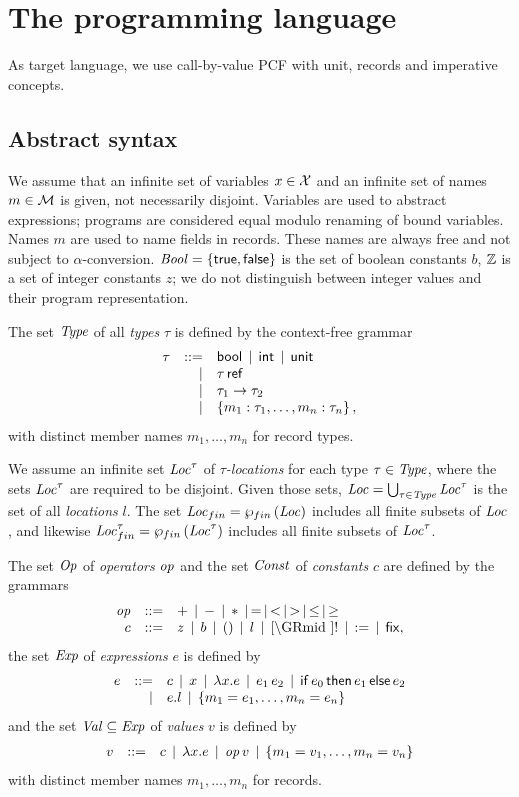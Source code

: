 \documentclass[12pt,a4paper]{report}
\begin{document}

\chapter{The programming language}

As target language, we use call-by-value PCF with unit, records and imperative concepts.



\section{Abstract syntax}

We assume that an infinite set of variables $x \in \mathcal{X}$ and an infinite
set of names $m\in \mathcal{M}$ is given, not necessarily disjoint.
Variables are used to abstract expressions; programs are considered equal modulo
renaming of bound variables. Names $m$ are used to name fields in records. These
names are always free and not subject to $\alpha$-conversion.
$\mathit{Bool} = \{\mathsf{true},\mathsf{false}\}$ is the set of boolean constants $b$,
$\mathbb Z$ is a set of integer constants $z$; we do not distinguish
between integer values and their program representation.

\begin{definition}[Types]
  The set $\mathit{Type}$ of all {\em types} $\tau$ is defined by the context-free grammar
  \[\begin{array}{rrlll}
  \tau & ::= & \mathsf{bool} \,\mid\, \mathsf{int} \,\mid\, \mathsf{unit}
          \\ & \mid & \tau\,\mathsf{ref}
          \\ & \mid & \tau_1\to\tau_2
          \\ & \mid & \left\{m_1:\tau_1,\ldots,m_n:\tau_n\right\},
  \end{array}\]
  with distinct member names $m_1,\ldots,m_n$ for record types.
\end{definition}

We assume an infinite set $\mathit{Loc}^\tau$ of {\em $\tau$-locations} for each type $\tau \in \mathit{Type}$,
where the sets $\mathit{Loc}^\tau$ are required to be disjoint. Given those sets,
$\mathit{Loc} = \bigcup_{\tau\in\mathit{Type}} \mathit{Loc}^\tau$ is the set of all {\em locations} $l$. The set
$\mathit{Loc}_{fin} = \wp_{fin}\,(\mathit{Loc})$ includes all finite subsets of $\mathit{Loc}$, and likewise $\mathit{Loc}_{fin}^\tau = \wp_{fin}\,(\mathit{Loc}^\tau)$
includes all finite subsets of $\mathit{Loc}^\tau$.

\begin{definition}[Expressions]
  The set $\mathit{Op}$ of {\em operators} $\mathit{op}$ and the set $\mathit{Const}$ of {\em constants} $c$
  are defined by the grammars
  \[\GRbeg
    \op \GRis + \GRmid - \GRmid * \GRmid = \GRmid < \GRmid > \GRmid \le \GRmid \ge \\
    c \GRis z \GRmid b \GRmid \unit \GRmid l \GRmid \cref \GRmid !
             \GRmid \assign \GRmid \fix,
  \GRend\]
  the set $\mathit{Exp}$ of {\em expressions} $e$ is defined by
  \[\begin{array}{rrlll}
    e & ::= & c \,\mid\, x \,\mid\, \lambda x.e \,\mid\, e_1\,e_2
           \,\mid\, \mathsf{if}\,e_0\,\mathsf{then}\,e_1\,\mathsf{else}\,e_2
           \\ & \mid & e.l \,\mid\, \left\{m_1=e_1,\ldots,m_n=e_n\right\}
  \end{array}\]
  and the set $\mathit{Val} \subseteq \mathit{Exp}$ of {\em values} $v$ is defined by
  \[\begin{array}{rrlll}
    v & ::= & c \,\mid\, \lambda x.e \,\mid\, \mathit{op}\,v \,\mid\, \left\{m_1=v_1,\ldots,m_n=v_n\right\}
  \end{array}\]
  with distinct member names $m_1,\ldots,m_n$ for records.
\end{definition}
\end{document}
